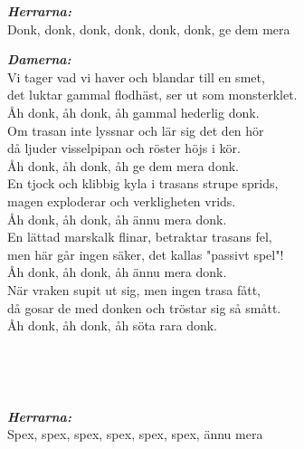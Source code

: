 \songtext{} 
\textbf{\textit{Herrarna:}}\\
\leftrepeat Donk, donk, donk, donk, donk, donk, ge dem mera \rightrepeat

\textbf{\textit{Damerna:}}\\
Vi tager vad vi haver och blandar till en smet,\\
det luktar gammal flodhäst, ser ut som monsterklet.\\
\leftrepeat Åh donk, åh donk, åh gammal hederlig donk. \rightrepeat\\
Om trasan inte lyssnar och lär sig det den hör\\
då ljuder visselpipan och röster höjs i kör.\\
\leftrepeat Åh donk, åh donk, åh ge dem mera donk. \rightrepeat\\
En tjock och klibbig kyla i trasans strupe sprids,\\
magen exploderar och verkligheten vrids.\\
\leftrepeat Åh donk, åh donk, åh ännu mera donk. \rightrepeat\\
En lättad marskalk flinar, betraktar trasans fel,\\
men här går ingen säker, det kallas "passivt spel"!\\
\leftrepeat Åh donk, åh donk, åh ännu mera donk. \rightrepeat\\
När vraken supit ut sig, men ingen trasa fått,\\
då gosar de med donken och tröstar sig så smått.\\
\leftrepeat Åh donk, åh donk, åh söta rara donk. \rightrepeat

\\

\newpage


 \\       
\author{Text: Rasmus Larsson, Osborne von Waldegg, m.fl.}

\songtext{} 
\textbf{\textit{Herrarna:}}\\
\leftrepeat Spex, spex, spex, spex, spex, spex, ännu mera \rightrepeat

